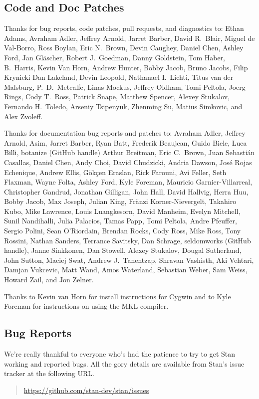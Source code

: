 \subsection*{Code  and Doc Patches}

Thanks for bug reports, code patches, pull requests, and diagnostics
to:
Ethan Adams,
Avraham Adler,
Jeffrey Arnold, 
Jarret Barber, 
David R.~Blair,
Miguel de Val-Borro, 
Ross Boylan, 
Eric N.~Brown, 
Devin Caughey, 
Daniel Chen,
Ashley Ford,
Jan Gl\"ascher,
Robert J.\ Goedman,
Danny Goldstein,
Tom Haber,
B.~Harris,
Kevin Van Horn,
Andrew Hunter,
Bobby Jacob,
Bruno Jacobs,
Filip Krynicki
Dan Lakeland,
Devin Leopold,
Nathanael I.~Lichti,
Titus van der Malsburg,
P.~D.~Metcalfe,
Linas Mockus,
Jeffrey Oldham,
Tomi Peltola,
Joerg Rings,
Cody T.\ Ross,
Patrick Snape,
Matthew Spencer,
Alexey Stukalov,
Fernando H.~Toledo,
Arseniy Tsipenyuk,
Zhenming Su,
Matius Simkovic, and
Alex Zvoleff.

Thanks for documentation bug reports and patches to:
Avraham Adler,
Jeffrey Arnold,
Asim,
Jarret Barber,
Ryan Batt,
Frederik Beaujean,
Guido Biele,
Luca Billi,
botanize (GitHub handle)
Arthur Breitman,
Eric C.~Brown,
Juan Sebasti\'an Casallas,
Daniel Chen,
Andy Choi, 
David Chudzicki,
Andria Dawson,
Jos\'{e} Rojas Echenique,
Andrew Ellis,
G\"{o}k\c{c}en Eraslan,
Rick Farouni,
Avi Feller,
Seth Flaxman,
Wayne Folta,
Ashley Ford,
Kyle Foreman,
Mauricio Garnier-Villarreal,
Christopher Gandrud,
Jonathan Gilligan,
John Hall,
David Hallvig,
Herra Huu,
Bobby Jacob,
Max Joseph,
Julian King,
Fr\"anzi Korner-Nievergelt,
Takahiro Kubo,
Mike Lawrence,
Louis Luangkesorn, 
David Manheim,
Evelyn Mitchell,
Sunil Nandihalli,
Julia Palacios,
Tamas Papp, 
Tomi Peltola,
Andre Pfeuffer,
Sergio Polini,
Sean O'Riordain, 
Brendan Rocks,
Cody Ross, 
Mike Ross, 
Tony Rossini,
Nathan Sanders,
Terrance Savitsky,
Dan Schrage,
seldomworks (GitHub handle),
Janne Sinkkonen,
Dan Stowell,
Alexey Stukalov,
Dougal Sutherland,
John Sutton,
Maciej Swat,
Andrew J.~Tanentzap,
Shravan Vashisth,
Aki Vehtari,
Damjan Vukcevic,
Matt Wand,
Amos Waterland,
Sebastian Weber,
Sam Weiss,
Howard Zail, and
Jon Zelner.

Thanks to Kevin van Horn for install instructions for Cygwin and to
Kyle Foreman for instructions on using the MKL compiler.


\subsection*{Bug Reports}

We're really thankful to everyone who's had the patience to try
to get Stan working and reported bugs.  All the gory details are
available from Stan's issue tracker at the following URL.
%
\begin{quote}
\url{https://github.com/stan-dev/stan/issues}
\end{quote}




